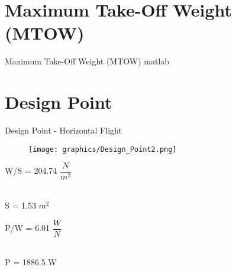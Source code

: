 
\section{Maximum Take-Off Weight (MTOW)}
\begin{frame}{Maximum Take-Off Weight (MTOW)}
    matlab
\end{frame}
\section{Design Point}
\begin{frame}{Design Point - Horizontal Flight}
\noindent
\begin{minipage}[t]{0.6\linewidth}
    \begin{figure}
	    \texttt{[image: graphics/Design\_Point2.png]}
    \end{figure}
\end{minipage}
\hfill%
\begin{minipage}[t]{0.3\linewidth}
    \begin{minipage}{3cm}
    \begin{block}{}
         W/S = 204.74 $\dfrac{N}{m^2}$
    \end{block}\centering{$\downarrow$}\\
    S = 1.53 $m^2$
    \end{minipage}
    \begin{minipage}{3cm}
    \vspace{0.5cm}
    \begin{block}{}
         P/W = 6.01 $\dfrac{W}{N}$
    \end{block}\centering{$\downarrow$}\\
    P = 1886.5 W
    \end{minipage}
\end{minipage}
\end{frame}
